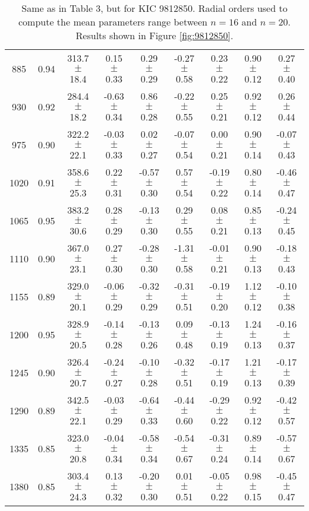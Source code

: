 \documentclass[twocolumn]{aastex61}%
\begin{document}
\begin{table*}[ht]
\begin{tabular}{ccc|ccccc|c}
885 & 0.94 & 313.7 $\pm$ 18.4 & 0.15 $\pm$ 0.33 & 0.29 $\pm$ 0.29 & -0.27 $\pm$ 0.58 & 0.23 $\pm$ 0.22 & 0.90 $\pm$ 0.12 & 0.27 $\pm$ 0.40\\
930 & 0.92 & 284.4 $\pm$ 18.2 & -0.63 $\pm$ 0.34 & 0.86 $\pm$ 0.28 & -0.22 $\pm$ 0.55 & 0.25 $\pm$ 0.21 & 0.92 $\pm$ 0.12 & 0.26 $\pm$ 0.44\\
975 & 0.90 & 322.2 $\pm$ 22.1 & -0.03 $\pm$ 0.33 & 0.02 $\pm$ 0.27 & -0.07 $\pm$ 0.54 & 0.00 $\pm$ 0.21 & 0.90 $\pm$ 0.14 & -0.07 $\pm$ 0.43\\
1020 & 0.91 & 358.6 $\pm$ 25.3 & 0.22 $\pm$ 0.31 & -0.57 $\pm$ 0.30 & 0.57 $\pm$ 0.54 & -0.19 $\pm$ 0.22 & 0.80 $\pm$ 0.14 & -0.46 $\pm$ 0.47\\
1065 & 0.95 & 383.2 $\pm$ 30.6 & 0.28 $\pm$ 0.29 & -0.13 $\pm$ 0.30 & 0.29 $\pm$ 0.55 & 0.08 $\pm$ 0.21 & 0.85 $\pm$ 0.13 & -0.24 $\pm$ 0.45\\
1110 & 0.90 & 367.0 $\pm$ 23.1 & 0.27 $\pm$ 0.30 & -0.28 $\pm$ 0.30 & -1.31 $\pm$ 0.58 & -0.01 $\pm$ 0.21 & 0.90 $\pm$ 0.13 & -0.18 $\pm$ 0.43\\
1155 & 0.89 & 329.0 $\pm$ 20.1 & -0.06 $\pm$ 0.29 & -0.32 $\pm$ 0.29 & -0.31 $\pm$ 0.51 & -0.19 $\pm$ 0.20 & 1.12 $\pm$ 0.12 & -0.10 $\pm$ 0.38\\
1200 & 0.95 & 328.9 $\pm$ 20.5 & -0.14 $\pm$ 0.28 & -0.13 $\pm$ 0.26 & 0.09 $\pm$ 0.48 & -0.13 $\pm$ 0.19 & 1.24 $\pm$ 0.13 & -0.16 $\pm$ 0.37\\
1245 & 0.90 & 326.4 $\pm$ 20.7 & -0.24 $\pm$ 0.27 & -0.10 $\pm$ 0.28 & -0.32 $\pm$ 0.51 & -0.17 $\pm$ 0.19 & 1.21 $\pm$ 0.13 & -0.17 $\pm$ 0.39\\
1290 & 0.89 & 342.5 $\pm$ 22.1 & -0.03 $\pm$ 0.29 & -0.64 $\pm$ 0.33 & -0.44 $\pm$ 0.60 & -0.29 $\pm$ 0.22 & 0.92 $\pm$ 0.12 & -0.42 $\pm$ 0.57\\
1335 & 0.85 & 323.0 $\pm$ 20.8 & -0.04 $\pm$ 0.34 & -0.58 $\pm$ 0.34 & -0.54 $\pm$ 0.67 & -0.31 $\pm$ 0.24 & 0.89 $\pm$ 0.14 & -0.57 $\pm$ 0.67\\
1380 & 0.85 & 303.4 $\pm$ 24.3 & 0.13 $\pm$ 0.32 & -0.20 $\pm$ 0.30 & 0.01 $\pm$ 0.51 & -0.05 $\pm$ 0.22 & 0.98 $\pm$ 0.15 & -0.45 $\pm$ 0.47\\
\end{tabular}
\caption{Same as in Table 3, but for KIC 9812850. Radial orders used to compute the mean parameters range between $n=16$ and $n=20$. Results shown in Figure \ref{fig:9812850}.}\label{tab:9812850}
\end{table*}
\end{document}
